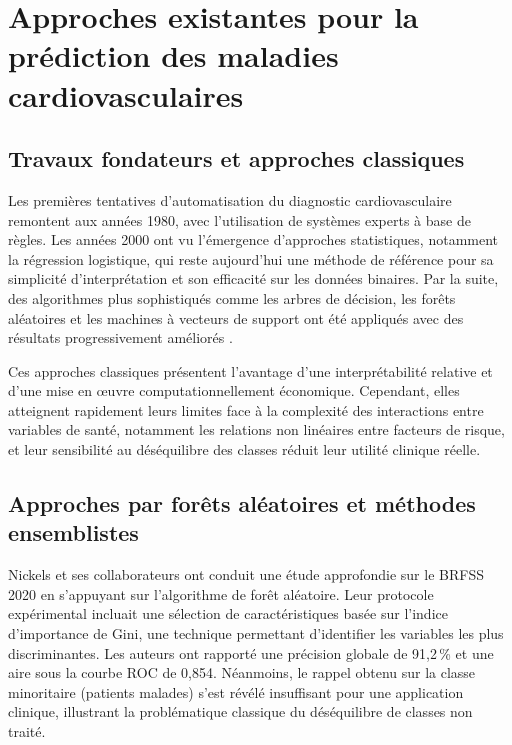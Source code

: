 \documentclass[12pt,a4paper]{report}
\begin{document}
\section{Approches existantes pour la prédiction des maladies cardiovasculaires}

\subsection{Travaux fondateurs et approches classiques}

Les premières tentatives d'automatisation du diagnostic cardiovasculaire remontent
aux années 1980, avec l'utilisation de systèmes experts à base de règles. Les années
2000 ont vu l'émergence d'approches statistiques, notamment la régression logistique,
qui reste aujourd'hui une méthode de référence pour sa simplicité d'interprétation et
son efficacité sur les données binaires. Par la suite, des algorithmes plus
sophistiqués comme les arbres de décision, les forêts aléatoires et les machines à
vecteurs de support ont été appliqués avec des résultats progressivement améliorés
\cite{breiman2001}.

Ces approches classiques présentent l'avantage d'une interprétabilité relative et
d'une mise en œuvre computationnellement économique. Cependant, elles atteignent
rapidement leurs limites face à la complexité des interactions entre variables de
santé, notamment les relations non linéaires entre facteurs de risque, et leur
sensibilité au déséquilibre des classes réduit leur utilité clinique réelle.

\subsection{Approches par forêts aléatoires et méthodes ensemblistes}

Nickels et ses collaborateurs \cite{nickels2023} ont conduit une étude approfondie
sur le \acs{BRFSS} 2020 en s'appuyant sur l'algorithme de forêt aléatoire. Leur
protocole expérimental incluait une sélection de caractéristiques basée sur l'indice
d'importance de Gini, une technique permettant d'identifier les variables les plus
discriminantes. Les auteurs ont rapporté une précision globale de 91,2\,\% et une
aire sous la courbe \acs{ROC} de 0,854. Néanmoins, le rappel obtenu sur la classe
minoritaire (patients malades) s'est révélé insuffisant pour une application
clinique, illustrant la problématique classique du déséquilibre de classes non
traité.
\end{document}
